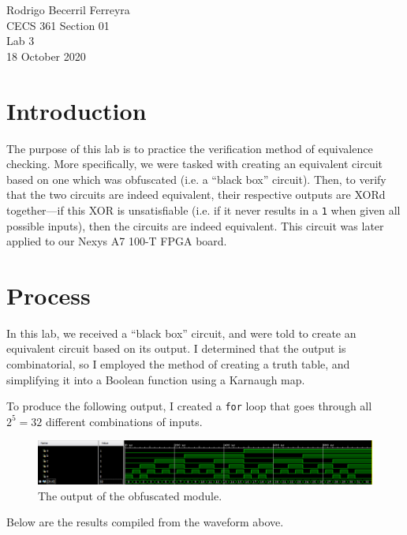 \documentclass{article}
\renewcommand{\c}[1]{\texttt{#1}}
\begin{document}
    \noindent
    Rodrigo Becerril Ferreyra\\
    CECS 361 Section 01\\
    Lab 3\\
    18 October 2020


\section{Introduction} The purpose of this lab is to practice
the verification method of equivalence checking. More
specifically, we were tasked with creating an equivalent
circuit based on one which was obfuscated (i.e. a 
``black box'' circuit). Then, to verify that the two circuits
are indeed equivalent, their respective outputs are
XORd together---if this XOR is unsatisfiable (i.e. if it never
results in a \c{1} when given all possible inputs),
then the circuits are indeed equivalent. This circuit was later
applied to our Nexys A7 100-T FPGA board.

\section{Process} In this lab,
we received a ``black box''
circuit, and were told to create an equivalent circuit based
on its output. I determined that the output is combinatorial,
so I employed the method of creating a truth table, and
simplifying it into a Boolean function using a Karnaugh map.

To produce the following output, I created a \c{for} loop that
goes through all \(2^5 = 32\) different combinations of
inputs.

\begin{figure}[H]
    \centering
    \includegraphics[width=\textwidth]{Images/waveform}
    \caption{The output of the obfuscated module.}
    \label{waveform1}
\end{figure}

Below are the results compiled from the waveform above.
\end{document}
